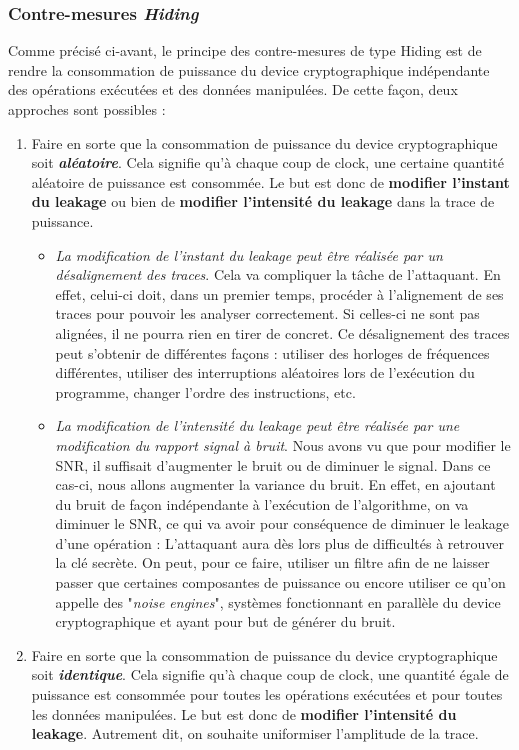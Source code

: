 \documentclass[oneside]{book}
\begin{document}
\subsubsection{Contre-mesures \textit{Hiding}}
\label{sec:hiding}
\vspace{-0.1 cm}Comme précisé ci-avant, le principe des contre-mesures de type Hiding est de rendre la consommation de puissance du device cryptographique indépendante des opérations exécutées et des données manipulées. De cette façon, deux approches sont possibles :
\begin{enumerate}
\item Faire en sorte que la consommation de puissance du device cryptographique soit \textbf{\textit{aléatoire}}. Cela signifie qu'à chaque coup de clock, une certaine quantité aléatoire de puissance est consommée. Le but est donc de \textbf{modifier l'instant du leakage} ou bien de \textbf{modifier l'intensité du leakage} dans la trace de puissance.
\begin{itemize}
\item \textit{La modification de l'instant du leakage peut être réalisée par un désalignement des traces}. Cela va compliquer la tâche de l'attaquant. En effet, celui-ci doit, dans un premier temps, procéder à l'alignement de ses traces pour pouvoir les analyser correctement. Si celles-ci ne sont pas alignées, il ne pourra rien en tirer de concret. Ce désalignement des traces peut s’obtenir de différentes façons : utiliser des horloges de fréquences différentes, utiliser des interruptions aléatoires lors de l’exécution du programme, changer l’ordre des instructions, etc.
\item \textit{La modification de l'intensité du leakage peut être réalisée par une modification du rapport signal à bruit}. Nous avons vu que pour modifier le SNR, il suffisait d'augmenter le bruit ou de diminuer le signal. Dans ce cas-ci, nous allons augmenter la variance du bruit. En effet, en ajoutant du bruit de façon indépendante à l'exécution de l'algorithme, on va diminuer le SNR, ce qui va avoir pour conséquence de diminuer le leakage d'une opération : L'attaquant aura dès lors plus de difficultés à retrouver la clé secrète. On peut, pour ce faire, utiliser un filtre afin de ne laisser passer que certaines composantes de puissance ou encore utiliser ce qu'on appelle des "\textit{noise engines}", systèmes fonctionnant en parallèle du device cryptographique et ayant pour but de générer du bruit.
\end{itemize}
\item Faire en sorte que la consommation de puissance du device cryptographique soit \textbf{\textit{identique}}. Cela signifie qu'à chaque coup de clock, une quantité égale de puissance est consommée pour toutes les opérations exécutées et pour toutes les données manipulées. Le but est donc de \textbf{modifier l'intensité du leakage}. Autrement dit, on souhaite uniformiser l'amplitude de la trace. 

\end{enumerate}
\end{document}
